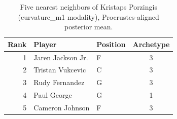 \begin{table}[htbp]
  \centering\small
  \begin{tabular}{rllc}
    \toprule
    Rank & Player & Position & Archetype \\
    \midrule
    1 & Jaren Jackson Jr. & F & 3 \\
    2 & Tristan Vukcevic & C & 3 \\
    3 & Rudy Fernandez & G & 3 \\
    4 & Paul George & G & 1 \\
    5 & Cameron Johnson & F & 3 \\
    \bottomrule
  \end{tabular}
  \caption{Five nearest neighbors of Kristaps Porzingis (curvature_m1 modality), Procrustes-aligned posterior mean.}
  \label{tab:Kristaps_Porzingis_neighbors_curvature_m1}
\end{table}

